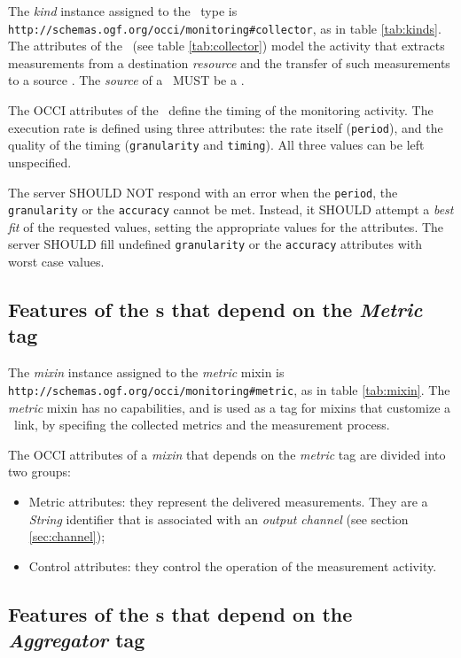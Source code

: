 \documentclass[10pt,a4paper]{article}
\begin{document}
The {\em kind} instance assigned to the \coll\ type is {\tt http://schemas.ogf.org/occi/monitoring\#collector}, as in table \ref{tab:kinds}. The attributes of the \coll\ (see table \ref{tab:collector}) model the activity that extracts measurements from a destination {\em resource} and the transfer of such measurements to a source \sens. The {\em source} of a \coll\ MUST be a \sens.

The OCCI attributes of the \coll\ define the timing of the monitoring activity.
The execution rate is defined using three attributes: the rate itself (\verb|period|), and the quality of the timing ({\tt granularity} and {\tt timing}). All three values can be left unspecified.

The server SHOULD NOT respond with an error when the {\tt period}, the {\tt granularity} or the {\tt accuracy} cannot be met. Instead, it SHOULD attempt a {\em best fit} of the requested values, setting the appropriate values for the attributes. The server SHOULD fill undefined {\tt granularity} or the {\tt accuracy} attributes with worst case values. 

\subsection{Features of the \mi s that depend on the {\em Metric} tag \label{sec:metric}}

The {\em mixin} instance assigned to the {\em metric} mixin is {\tt http://schemas.ogf.org/occi/monitoring\#metric}, as in table \ref{tab:mixin}. The {\em metric} mixin has no capabilities, and is used as a tag for mixins that customize a \coll\ link, by specifing the collected metrics and the measurement process.

The OCCI attributes of a {\em mixin} that depends on the {\em metric} tag are divided into two groups:
\begin{itemize}

\item Metric attributes: they represent the delivered measurements. They are a {\em String} identifier that is associated with an {\em output channel} (see section \ref{sec:channel});
\item Control attributes: they control the operation of the measurement activity.
\end{itemize}

\subsection{Features of the \mi s that depend on the {\em Aggregator} tag \label{sec:aggregator}}
\end{document}
